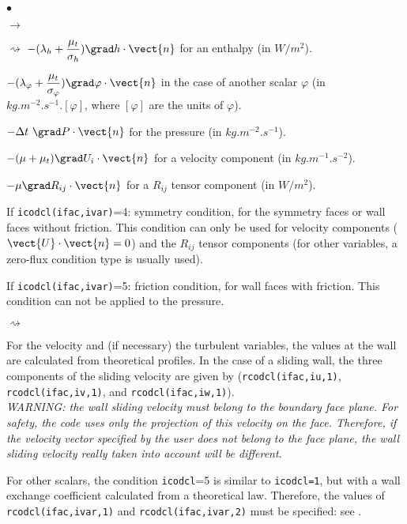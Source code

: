 {{{\begin{list}{$\bullet$}{}
\begin{list}{$\rightarrow$}{}
\begin{list}{$\rightsquigarrow$}{}
$\displaystyle -(\lambda_h+\frac{\mu_t}{\sigma_h})\grad h\cdot\vect{n}$
     for an enthalpy (in $W/m^2$).

$\displaystyle -(\lambda_\varphi+\frac{\mu_t}{\sigma_\varphi})\grad\varphi\cdot\vect{n}$ in the case of another scalar $\varphi$ (in $kg.m^{-2}.s^{-1}.[\varphi]$, where $[\varphi]$ are the units of $\varphi$).

\item $-\Delta t\ \grad P\cdot\vect{n}$ for the pressure (in $kg.m^{-2}.s^{-1}$).

\item $-(\mu+\mu_t)\grad U_i\cdot\vect{n}$ for a velocity component (in $kg.m^{-1}.s^{-2}$).

\item $-\mu\grad R_{ij}\cdot\vect{n}$ for a $R_{ij}$ tensor component (in $W/m^2$).
\end{list}

\end{list}

\item If \texttt{icodcl(ifac,ivar)}=4: symmetry condition, for the symmetry
      faces or wall faces without friction. This condition can only be
      used for velocity components ($\vect{U}\cdot\vect{n}=0$) and
      the $R_{ij}$ tensor components (for other variables, a zero-flux
      condition type is usually used).\\

\item If \texttt{icodcl(ifac,ivar)}=5: friction condition, for wall faces
      with friction. This condition can not be applied to the pressure.
\begin{list}{$\rightsquigarrow$}{}
\item For the velocity and (if necessary) the turbulent variables, the
      values at the wall are calculated from theoretical profiles. In
      the case of a sliding wall, the three components of the sliding
      velocity are given by (\texttt{rcodcl(ifac,iu,1)},
      \texttt{rcodcl(ifac,iv,1)}, and \texttt{rcodcl(ifac,iw,1)}).\\
{\em WARNING: the wall sliding velocity must belong to the boundary face
      plane. For safety, the code uses only the projection of this
      velocity on the face. Therefore, if the velocity vector specified
      by the user does not belong to the face plane, the wall sliding velocity really
      taken into account will be different.}

\item For other scalars, the condition \texttt{icodcl}=5 is similar to
      \texttt{icodcl=1}, but with a wall exchange coefficient calculated from a
      theoretical law. Therefore, the values of \texttt{rcodcl(ifac,ivar,1)} and
      \texttt{rcodcl(ifac,ivar,2)} must be specified: see \cite{theory}.
\end{list}


\end{list}}}}
